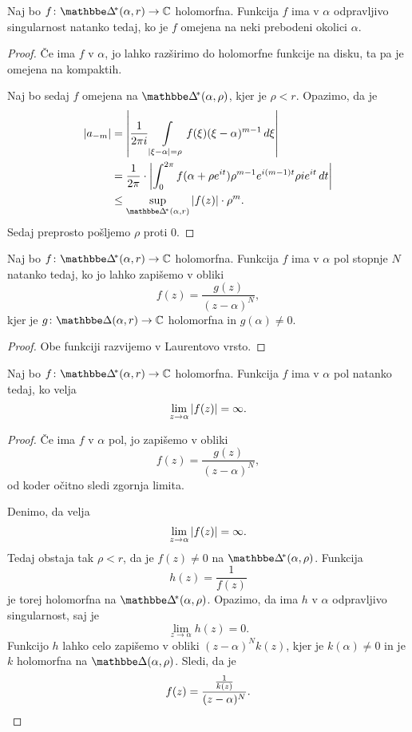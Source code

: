 \begin{trditev}
Naj bo $f \colon \dskx(\alpha, r) \to \C$ holomorfna. Funkcija $f$
ima v $\alpha$ odpravljivo singularnost natanko tedaj, ko je $f$
omejena na neki prebodeni okolici $\alpha$.
\end{trditev}

\begin{proof}
Če ima $f$ v $\alpha$, jo lahko razširimo do holomorfne funkcije na
disku, ta pa je omejena na kompaktih.

Naj bo sedaj $f$ omejena na $\dskx(\alpha, \rho)$, kjer je
$\rho < r$. Opazimo, da je
\begin{align*}
\abs{a_{-m}} &=
\abs{\frac{1}{2 \pi i} \lint_{\abs{\xi - \alpha} = \rho}
f(\xi) (\xi - \alpha)^{m-1}\,d\xi}
\\
&=
\frac{1}{2 \pi} \cdot \abs{ \int_0^{2 \pi} f(\alpha + \rho e^{it})
\rho^{m-1} e^{i(m-1)t} \rho i e^{it}\,dt}
\\
&\leq
\sup_{\dskx(\alpha, r)} \abs{f(z)} \cdot \rho^m.
\end{align*}
Sedaj preprosto pošljemo $\rho$ proti $0$.
\end{proof}


\begin{trditev}
Naj bo $f \colon \dskx(\alpha, r) \to \C$ holomorfna. Funkcija $f$
ima v $\alpha$ pol stopnje $N$ natanko tedaj, ko jo lahko zapišemo
v obliki
\[
f(z) = \frac{g(z)}{(z - \alpha)^N},
\]
kjer je $g \colon \dsk(\alpha, r) \to \C$ holomorfna in
$g(\alpha) \ne 0$.
\end{trditev}

\begin{proof}
Obe funkciji razvijemo v Laurentovo vrsto.
\end{proof}

\begin{izrek}
Naj bo $f \colon \dskx(\alpha, r) \to \C$ holomorfna. Funkcija $f$
ima v $\alpha$ pol natanko tedaj, ko velja
\[
\lim_{z \to \alpha} \left\lvert f(z)\right\rvert = \infty.
\]
\end{izrek}

\begin{proof}
Če ima $f$ v $\alpha$ pol, jo zapišemo v obliki
\[
f(z) = \frac{g(z)}{(z - \alpha)^N},
\]
od koder očitno sledi zgornja limita.

Denimo, da velja
\[
\lim_{z \to \alpha} \left\lvert f(z)\right\rvert = \infty.
\]
Tedaj obstaja tak $\rho < r$, da je $f(z) \ne 0$ na
$\dskx(\alpha, \rho)$. Funkcija
\[
h(z) = \frac{1}{f(z)}
\]
je torej holomorfna na $\dskx(\alpha, \rho)$. Opazimo, da ima $h$
v $\alpha$ odpravljivo singularnost, saj je
\[
\lim_{z \to \alpha} h(z) = 0.
\]
Funkcijo $h$ lahko celo zapišemo v obliki $(z - \alpha)^N k(z)$,
kjer je $k(\alpha) \ne 0$ in je $k$ holomorfna na
$\dsk(\alpha, \rho)$. Sledi, da je
\[
f(z) = \frac{\frac{1}{k(z)}}{(z - \alpha)^N}. \qedhere
\]
\end{proof}

